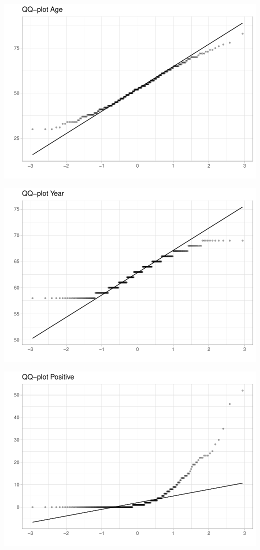 \documentclass[
]{article}
\begin{document}
\begin{center}\includegraphics{EDA2_files/figure-latex/unnamed-chunk-18-1} \end{center}

\begin{center}\includegraphics{EDA2_files/figure-latex/unnamed-chunk-18-2} \end{center}

\begin{center}\includegraphics{EDA2_files/figure-latex/unnamed-chunk-18-3} \end{center}
\end{document}

